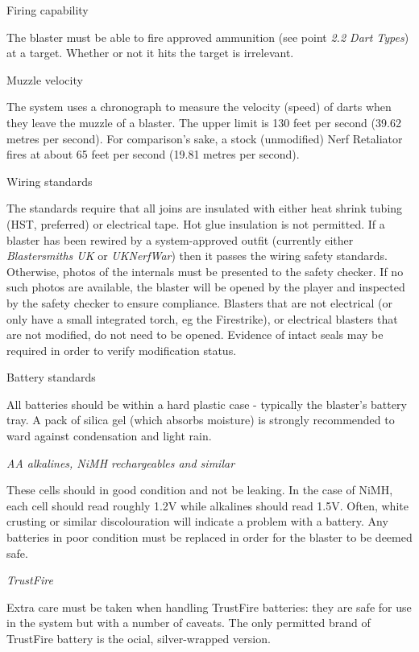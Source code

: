 \documentclass{scrbook}
\begin{document}
Firing capability

The blaster must be able to fire approved ammunition (see point \textit{2.2 Dart Types}) at a target. Whether or not it hits the target is irrelevant.

Muzzle velocity

The system uses a chronograph to measure the velocity (speed) of darts when they leave the muzzle of a blaster. The upper limit is 130 feet per second (39.62 metres per second). For comparison's sake, a stock (unmodified) Nerf Retaliator fires at about 65 feet per second (19.81 metres per second).

Wiring standards

The standards require that all joins are insulated with either heat shrink tubing (HST, preferred) or electrical tape. Hot glue insulation is not permitted. If a blaster has been rewired by a system-approved outfit (currently either \textit{Blastersmiths UK} or \textit{UKNerfWar}) then it passes the wiring safety standards. Otherwise, photos of the internals must be presented to the safety checker. If no such photos are available, the blaster will be opened by the player and inspected by the safety checker to ensure compliance. Blasters that are not electrical (or only have a small integrated torch, eg the Firestrike), or electrical blasters that are not modified, do not need to be opened. Evidence of intact seals may be required in order to verify modification status.

Battery standards

All batteries should be within a hard plastic case - typically the blaster's battery tray. A pack of silica gel (which absorbs moisture) is strongly recommended to ward against condensation and light rain.

\textit{AA alkalines, NiMH rechargeables and similar}

These cells should in good condition and not be leaking. In the case of NiMH, each cell should read roughly 1.2V while alkalines should read 1.5V. Often, white crusting or similar discolouration will indicate a problem with a battery. Any batteries in poor condition must be replaced in order for the blaster to be deemed safe.

\textit{TrustFire}

Extra care must be taken when handling TrustFire batteries: they are safe for use in the system but with a number of caveats. The only permitted brand of TrustFire battery is the ocial, silver-wrapped version.
\end{document}
